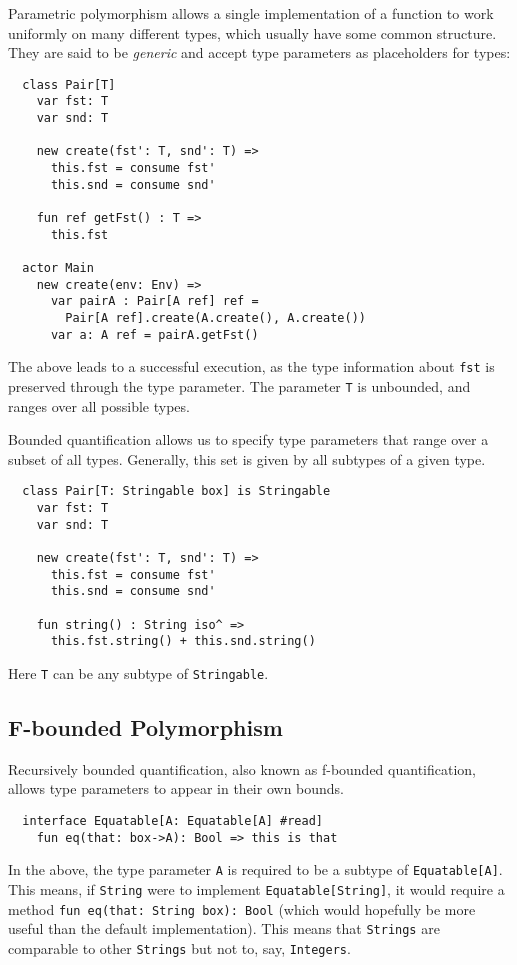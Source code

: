 Parametric polymorphism allows a single implementation of a function to work uniformly on many different types, which usually have some common structure. They are said to be \textit{generic} and accept type parameters as placeholders for types:

\begin{verbatim}
  class Pair[T]
    var fst: T 
    var snd: T 
  
    new create(fst': T, snd': T) =>
      this.fst = consume fst'
      this.snd = consume snd'
    
    fun ref getFst() : T =>
      this.fst

  actor Main
    new create(env: Env) =>
      var pairA : Pair[A ref] ref = 
        Pair[A ref].create(A.create(), A.create())
      var a: A ref = pairA.getFst()
\end{verbatim}
The above leads to a successful execution, as the type information about \texttt{fst} is preserved through the type parameter. The parameter \texttt{T} is unbounded, and ranges over all possible types.

Bounded quantification allows us to specify type parameters that range over a subset of all types. Generally, this set is given by all subtypes of a given type.

\begin{verbatim}
  class Pair[T: Stringable box] is Stringable
    var fst: T 
    var snd: T 
  
    new create(fst': T, snd': T) =>
      this.fst = consume fst'
      this.snd = consume snd'
    
    fun string() : String iso^ =>
      this.fst.string() + this.snd.string()
\end{verbatim}
Here \texttt{T} can be any subtype of \texttt{Stringable}.

\subsection{F-bounded Polymorphism}

Recursively bounded quantification, also known as f-bounded quantification, allows type parameters to appear in their own bounds.
\begin{verbatim}
  interface Equatable[A: Equatable[A] #read]
    fun eq(that: box->A): Bool => this is that
\end{verbatim}
In the above, the type parameter \texttt{A} is required to be a subtype of \texttt{Equatable[A]}. This means, if \texttt{String} were to implement \texttt{Equatable[String]}, it would require a method \texttt{fun eq(that: String box): Bool} (which would hopefully be more useful than the default implementation). This means that \texttt{Strings} are comparable to other \texttt{Strings} but not to, say, \texttt{Integers}.

